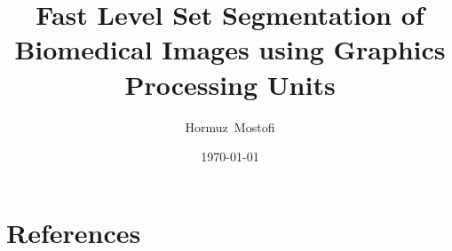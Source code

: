 \documentclass[a4paper,11pt]{report}
\begin{document}
\title{Fast Level Set Segmentation of Biomedical Images using Graphics Processing Units}
\author{Hormuz~Mostofi}
\date{\today}
\maketitle

\setcounter{tocdepth}{1}
\begin{spacing}{1.2}
\tableofcontents
\end{spacing}








\chapter{References}







\end{document}
